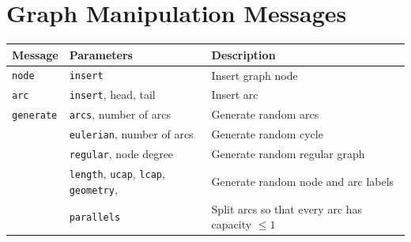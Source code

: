 \documentclass[a4paper,11pt,twoside]{book}
\begin{document}
\section{Graph Manipulation Messages}
\begin{center}
\begin{tabular}{|p{2cm}|p{7cm}|p{15.5cm}|}
\hline
{\bf Message}       & {\bf Parameters} & {\bf Description} \\
\hline
\hline
\verb/node/         & \verb/insert/     & Insert graph node \\
\hline
\verb/arc/          & \verb/insert/, head, tail & Insert arc \\
\hline
\verb/generate/     & \verb/arcs/, number of arcs  & Generate random arcs \\
\hline
                    & \verb/eulerian/, number of arcs & Generate random cycle \\
\hline
                    & \verb/regular/, node degree & Generate random regular graph \\
\hline
                    & \verb/length/, \verb/ucap/, \verb/lcap/, \verb/geometry/,
                    & Generate random node and arc labels \\
\hline
                    & \verb/parallels/
                    & Split arcs so that every arc has capacity $\leq 1$\\
\hline
\end{tabular}
\end{center}
\end{document}
